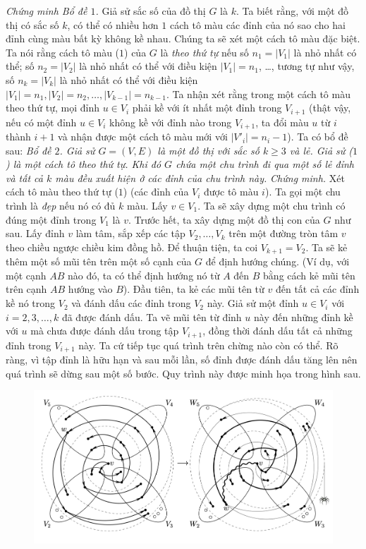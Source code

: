 \begin{multicols}{2}
	\vskip 0.1cm
	\textit{Chứng minh Bổ đề $1$.} Giả sử sắc số của đồ thị $G$ là $k$. Ta biết rằng, với một đồ thị có sắc số $k$, có thể có nhiều hơn $1$ cách tô màu các đỉnh của nó sao cho hai đỉnh cùng màu bất kỳ không kề nhau. Chúng ta sẽ xét một cách tô màu đặc biệt. 
	Ta nói rằng cách tô màu ($1$) của $G$ là \textit{theo thứ tự} nếu số $n_1 = |V_1|$ là nhỏ nhất có thể; số $n_2 =|V_2|$ là nhỏ nhất có thể với điều kiện $|V_1| = n_1$, \dots,  tương tự như vậy, số $n_k = |V_k|$ là nhỏ nhất có thể với điều kiện $|V_1| = n_1, |V_2|= n_2,\dots, |V_{k-1}| = n_{k-1}$. Ta nhận xét rằng trong một cách tô màu theo thứ tự, mọi đỉnh  $u \in V_i$ phải kề với ít nhất một đỉnh trong $V_{i + 1}$ (thật vậy, nếu có một đỉnh $u \in V_i$ không kề với đỉnh nào trong $V_{i  +1}$, ta đổi màu $u$ từ $i$ thành $i + 1$ và nhận được một cách tô màu mới với $|V'_i| = n_i - 1$). Ta có bổ đề sau:
	\vskip 0.1cm
	\textit{{Bổ đề $2$.} Giả sử $G=(V,E)$ là một đồ thị với sắc số $k \geq 3$ và lẻ. Giả sử ($1$) là một cách tô theo thứ tự. Khi đó $G$ chứa một chu trình đi qua một số lẻ đỉnh và tất cả $k$ màu đều xuất hiện ở các đỉnh của chu trình này.}
	\vskip 0.1cm
	\textit{Chứng minh.} Xét cách tô màu theo thứ tự ($1$) (các đỉnh của $V_i$ được tô màu $i$). Ta gọi một chu trình là \textit{đẹp} nếu nó có đủ $k$ màu. Lấy $v \in V_1$. Ta sẽ xây dựng một chu trình có đúng một đỉnh trong $V_1$ là $v$.
	\vskip 0.1cm
	Trước hết, ta xây dựng một đồ thị con của $G$ như sau. Lấy đỉnh $v$ làm tâm, sắp xếp các tập $V_2,\dots,V_k$ trên một đường tròn tâm $v$ theo chiều ngược chiều kim đồng hồ. Để thuận tiện, ta coi $V_{k+1}=V_2$. Ta sẽ kẻ thêm một số mũi tên trên một số cạnh của $G$ để định hướng chúng. (Ví dụ, với một cạnh $AB$ nào đó, ta có thể định hướng nó từ $A$ đến $B$ bằng cách kẻ mũi tên trên cạnh $AB$ hướng vào $B$). Đầu tiên, ta kẻ các mũi tên từ $v$ đến tất cả các đỉnh kề nó trong $V_2$ và đánh dấu các đỉnh trong $V_2$ này. Giả sử một đỉnh $ u \in V_i$ với $i=2, 3, \ldots, k$ đã được đánh dấu. Ta vẽ mũi tên từ đỉnh $u$ này đến những đỉnh kề với $u$ mà chưa được đánh dấu trong tập $V_{i+1}$, đồng thời đánh dấu tất cả những đỉnh trong $V_{i+1}$ này. Ta cứ tiếp tục quá trình trên chừng nào còn có thể. Rõ ràng, vì tập đỉnh là hữu hạn và sau mỗi lần, số đỉnh được đánh dấu tăng lên nên quá trình sẽ dừng sau một số bước. Quy trình này được minh họa trong hình sau.
	\begin{figure}[H]
		\vspace*{-5pt}
		\centering
		\captionsetup{labelformat= empty, justification=centering}
		\includegraphics[width= 1\linewidth]{C7_SL2015IMO}

\end{figure}
\end{multicols}
